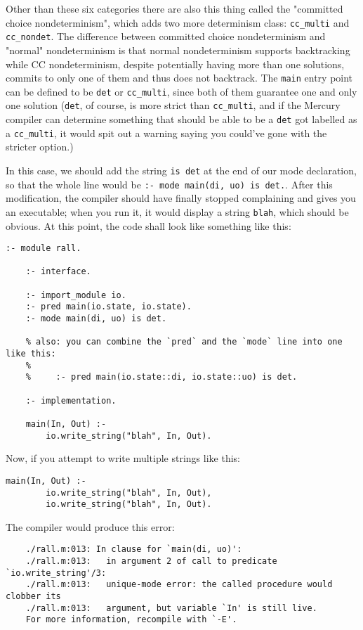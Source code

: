 Other than these six categories there are also this thing called the "committed choice nondeterminism", which adds two more determinism class: \texttt{cc\_multi} and \texttt{cc\_nondet}. The difference between committed choice nondeterminism and "normal" nondeterminism is that normal nondeterminism supports backtracking while CC nondeterminism, despite potentially having more than one solutions, commits to only one of them and thus does not backtrack. The \texttt{main} entry point can be defined to be \texttt{det} or \texttt{cc\_multi}, since both of them guarantee one and only one solution (\texttt{det}, of course, is more strict than \texttt{cc\_multi}, and if the Mercury compiler can determine something that should be able to be a \texttt{det} got labelled as a \texttt{cc\_multi}, it would spit out a warning saying you could've gone with the stricter option.)

In this case, we should add the string \texttt{is det} at the end of our mode declaration, so that the whole line would be \texttt{:- mode main(di, uo) is det.}. After this modification, the compiler should have finally stopped complaining and gives you an executable; when you run it, it would display a string \texttt{blah}, which should be obvious. At this point, the code shall look like something like this:

\begin{lstlisting}[language=Mercury]
	:- module rall.
	
	:- interface.
	
	:- import_module io.
	:- pred main(io.state, io.state).
	:- mode main(di, uo) is det.
	
	% also: you can combine the `pred` and the `mode` line into one like this:
	%
	%     :- pred main(io.state::di, io.state::uo) is det.
	
	:- implementation.
	
	main(In, Out) :-
	    io.write_string("blah", In, Out).
\end{lstlisting}

Now, if you attempt to write multiple strings like this:

\begin{lstlisting}[language=Mercury]
	main(In, Out) :-
	    io.write_string("blah", In, Out),
	    io.write_string("blah", In, Out).
\end{lstlisting}

The compiler would produce this error:

\begin{lstlisting}
	./rall.m:013: In clause for `main(di, uo)':
	./rall.m:013:   in argument 2 of call to predicate `io.write_string'/3:
	./rall.m:013:   unique-mode error: the called procedure would clobber its
	./rall.m:013:   argument, but variable `In' is still live.
	For more information, recompile with `-E'.
\end{lstlisting}

